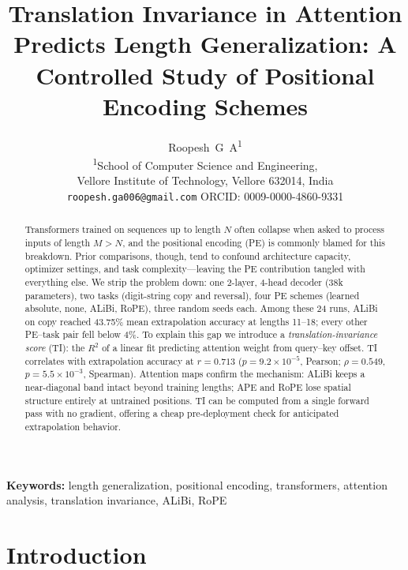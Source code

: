 \documentclass[10pt,twocolumn]{article}
\begin{document}
\title{Translation Invariance in Attention Predicts Length Generalization: A Controlled Study of Positional Encoding Schemes}

\author{Roopesh~G~A\textsuperscript{1}\\[4pt]
\small\textsuperscript{1}School of Computer Science and Engineering,\\
\small Vellore Institute of Technology, Vellore 632014, India\\
\small\texttt{roopesh.ga006@gmail.com} \quad ORCID: 0009-0000-4860-9331
}

\date{}

\maketitle

\begin{abstract}
Transformers trained on sequences up to length $N$ often collapse when asked to process inputs of length $M > N$, and the positional encoding (PE) is commonly blamed for this breakdown.
Prior comparisons, though, tend to confound architecture capacity, optimizer settings, and task complexity---leaving the PE contribution tangled with everything else.
We strip the problem down: one 2-layer, 4-head decoder (38k parameters), two tasks (digit-string copy and reversal), four PE schemes (learned absolute, none, ALiBi, RoPE), three random seeds each.
Among these 24 runs, ALiBi on copy reached 43.75\% mean extrapolation accuracy at lengths 11--18; every other PE--task pair fell below 4\%.
To explain this gap we introduce a \emph{translation-invariance score} (TI): the $R^2$ of a linear fit predicting attention weight from query--key offset.
TI correlates with extrapolation accuracy at $r{=}0.713$ ($p{=}9.2\times10^{-5}$, Pearson; $\rho{=}0.549$, $p{=}5.5\times10^{-3}$, Spearman).
Attention maps confirm the mechanism: ALiBi keeps a near-diagonal band intact beyond training lengths; APE and RoPE lose spatial structure entirely at untrained positions.
TI can be computed from a single forward pass with no gradient, offering a cheap pre-deployment check for anticipated extrapolation behavior.
\end{abstract}

\medskip
\noindent\textbf{Keywords:} length generalization, positional encoding, transformers, attention analysis, translation invariance, ALiBi, RoPE

\section{Introduction}
\label{sec:intro}
\end{document}
